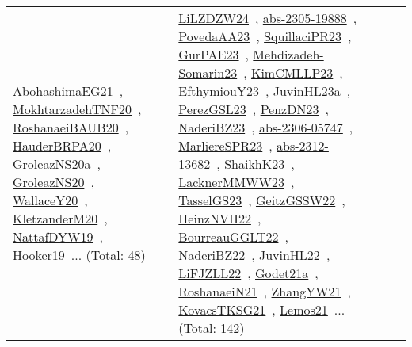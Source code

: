 {\begin{longtable}{lp{3cm}>{\raggedright\arraybackslash}p{6cm}>{\raggedright\arraybackslash}p{6cm}>{\raggedright\arraybackslash}p{8cm}}
\href{../works/AbohashimaEG21.pdf}{AbohashimaEG21}~\cite{AbohashimaEG21}, \href{../works/MokhtarzadehTNF20.pdf}{MokhtarzadehTNF20}~\cite{MokhtarzadehTNF20}, \href{../works/RoshanaeiBAUB20.pdf}{RoshanaeiBAUB20}~\cite{RoshanaeiBAUB20}, \href{../works/HauderBRPA20.pdf}{HauderBRPA20}~\cite{HauderBRPA20}, \href{../works/GroleazNS20a.pdf}{GroleazNS20a}~\cite{GroleazNS20a}, \href{../works/GroleazNS20.pdf}{GroleazNS20}~\cite{GroleazNS20}, \href{../works/WallaceY20.pdf}{WallaceY20}~\cite{WallaceY20}, \href{../works/KletzanderM20.pdf}{KletzanderM20}~\cite{KletzanderM20}, \href{../works/NattafDYW19.pdf}{NattafDYW19}~\cite{NattafDYW19}, \href{../works/Hooker19.pdf}{Hooker19}~\cite{Hooker19}... (Total: 48) & \href{../works/LiLZDZW24.pdf}{LiLZDZW24}~\cite{LiLZDZW24}, \href{../works/abs-2305-19888.pdf}{abs-2305-19888}~\cite{abs-2305-19888}, \href{../works/PovedaAA23.pdf}{PovedaAA23}~\cite{PovedaAA23}, \href{../works/SquillaciPR23.pdf}{SquillaciPR23}~\cite{SquillaciPR23}, \href{../works/GurPAE23.pdf}{GurPAE23}~\cite{GurPAE23}, \href{../works/Mehdizadeh-Somarin23.pdf}{Mehdizadeh-Somarin23}~\cite{Mehdizadeh-Somarin23}, \href{../works/KimCMLLP23.pdf}{KimCMLLP23}~\cite{KimCMLLP23}, \href{../works/EfthymiouY23.pdf}{EfthymiouY23}~\cite{EfthymiouY23}, \href{../works/JuvinHL23a.pdf}{JuvinHL23a}~\cite{JuvinHL23a}, \href{../works/PerezGSL23.pdf}{PerezGSL23}~\cite{PerezGSL23}, \href{../works/PenzDN23.pdf}{PenzDN23}~\cite{PenzDN23}, \href{../works/NaderiBZ23.pdf}{NaderiBZ23}~\cite{NaderiBZ23}, \href{../works/abs-2306-05747.pdf}{abs-2306-05747}~\cite{abs-2306-05747}, \href{../works/MarliereSPR23.pdf}{MarliereSPR23}~\cite{MarliereSPR23}, \href{../works/abs-2312-13682.pdf}{abs-2312-13682}~\cite{abs-2312-13682}, \href{../works/ShaikhK23.pdf}{ShaikhK23}~\cite{ShaikhK23}, \href{../works/LacknerMMWW23.pdf}{LacknerMMWW23}~\cite{LacknerMMWW23}, \href{../works/TasselGS23.pdf}{TasselGS23}~\cite{TasselGS23}, \href{../works/GeitzGSSW22.pdf}{GeitzGSSW22}~\cite{GeitzGSSW22}, \href{../works/HeinzNVH22.pdf}{HeinzNVH22}~\cite{HeinzNVH22}, \href{../works/BourreauGGLT22.pdf}{BourreauGGLT22}~\cite{BourreauGGLT22}, \href{../works/NaderiBZ22.pdf}{NaderiBZ22}~\cite{NaderiBZ22}, \href{../works/JuvinHL22.pdf}{JuvinHL22}~\cite{JuvinHL22}, \href{../works/LiFJZLL22.pdf}{LiFJZLL22}~\cite{LiFJZLL22}, \href{../works/Godet21a.pdf}{Godet21a}~\cite{Godet21a}, \href{../works/RoshanaeiN21.pdf}{RoshanaeiN21}~\cite{RoshanaeiN21}, \href{../works/ZhangYW21.pdf}{ZhangYW21}~\cite{ZhangYW21}, \href{../works/KovacsTKSG21.pdf}{KovacsTKSG21}~\cite{KovacsTKSG21}, \href{../works/Lemos21.pdf}{Lemos21}~\cite{Lemos21}... (Total: 142)\\

\end{longtable}}
